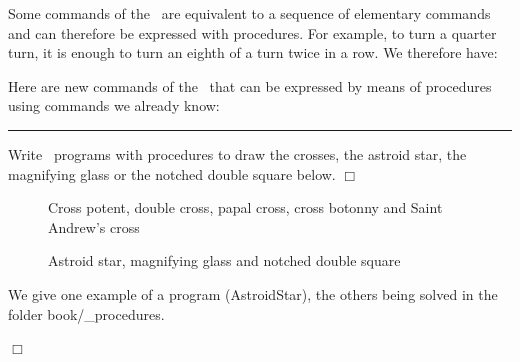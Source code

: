 Some commands of the \robot\ are equivalent to a sequence
of elementary commands and can therefore be expressed with procedures.
For example, to turn a quarter turn, it is enough to turn an eighth of a turn twice
in a row. We therefore have:

\noindent Here are new commands of the \robot\ that can be expressed by means of
procedures using commands we already know:

\noindent \rule{137mm}{0.1mm}\par\nopagebreak %
\begin{exercices}{
Write \python\ programs with pro\-ce\-dures to
draw the crosses,
the astroid star, the magnifying glass or the notched double square
below.
\noindent $\Box$}\end{exercices}
\begin{figure}[htbp]
 \vspace{-\baselineskip}
 \caption{Cross potent, double cross, papal cross, cross botonny and Saint Andrew's cross}
\end{figure}
\begin{figure}[htbp]
 \caption{Astroid star, magnifying glass and notched double square}
\end{figure}


\begin{corrige}{
We give one example of a program ({\idt AstroidStar}), the
others being solved in the folder {\idt book/\_procedures}.

\noindent $\Box$}\end{corrige}

\vfill

